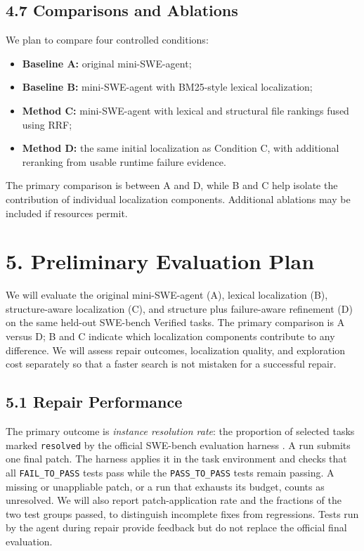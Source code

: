 \documentclass[11pt]{article}
\begin{document}
\subsection*{4.7 Comparisons and Ablations}

We plan to compare four controlled conditions:

\begin{itemize}[leftmargin=*, itemsep=0.25em]
    \item \textbf{Baseline A:} original mini-SWE-agent;
    \item \textbf{Baseline B:} mini-SWE-agent with BM25-style lexical localization;
    \item \textbf{Method C:} mini-SWE-agent with lexical and structural file rankings fused using RRF;
    \item \textbf{Method D:} the same initial localization as Condition C, with additional reranking
from usable runtime failure evidence.
\end{itemize}

The primary comparison is between A and D, while B and C help isolate the
contribution of individual localization components. Additional ablations may
be included if resources permit.


\section*{5. Preliminary Evaluation Plan}

We will evaluate the original mini-SWE-agent (A), lexical localization
(B), structure-aware localization (C), and structure plus failure-aware
refinement (D) on the same held-out SWE-bench Verified tasks. The
primary comparison is A versus D; B and C indicate which localization
components contribute to any difference. We will assess repair outcomes,
localization quality, and exploration cost separately so that a faster
search is not mistaken for a successful repair.

\subsection*{5.1 Repair Performance}

The primary outcome is \emph{instance resolution rate}: the proportion
of selected tasks marked \texttt{resolved} by the official SWE-bench
evaluation harness \cite{jimenez2024swebench,swebenchharness}. A run
submits one final patch. The harness applies it in the task environment
and checks that all \texttt{FAIL\_TO\_PASS} tests pass while the
\texttt{PASS\_TO\_PASS} tests remain passing. A missing or unappliable
patch, or a run that exhausts its budget, counts as unresolved. We will
also report patch-application rate and the fractions of the two test
groups passed, to distinguish incomplete fixes from regressions. Tests
run by the agent during repair provide feedback but do not replace the
official final evaluation.
\end{document}
